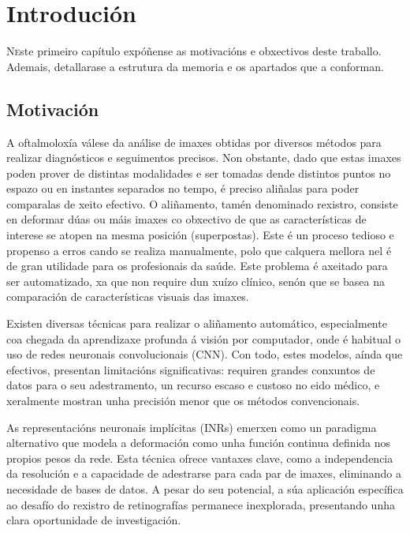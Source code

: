 \chapter{Introdución}
\label{chap:introducion}

\lettrine{N} este primeiro capítulo expóñense as motivacións e obxectivos deste traballo. Ademais, detallarase a estrutura da memoria e os apartados que a conforman.

\section{Motivación}
\label{sec:motivacion}

A oftalmoloxía válese da análise de imaxes obtidas por diversos métodos para realizar diagnósticos e seguimentos precisos. Non obstante, dado que estas imaxes poden prover de distintas modalidades e ser tomadas dende distintos puntos no espazo ou en instantes separados no tempo, é preciso aliñalas para poder comparalas de xeito efectivo. O aliñamento, tamén denominado rexistro, consiste en deformar dúas ou máis imaxes co obxectivo de que as características de interese se atopen na mesma posición (superpostas). Este é un proceso tedioso e propenso a erros cando se realiza manualmente, polo que calquera mellora nel é de gran utilidade para os profesionais da saúde. Este problema é axeitado para ser automatizado, xa que non require dun xuízo clínico, senón que se basea na comparación de características visuais das imaxes.

Existen diversas técnicas para realizar o aliñamento automático, especialmente coa chegada da aprendizaxe profunda á visión por computador, onde é habitual o uso de redes neuronais convolucionais (CNN). Con todo, estes modelos, aínda que efectivos, presentan limitacións significativas: requiren grandes conxuntos de datos para o seu adestramento, un recurso escaso e custoso no eido médico, e xeralmente mostran unha precisión menor que os métodos convencionais.

As representacións neuronais implícitas (INRs) emerxen como un paradigma alternativo que modela a deformación como unha función continua definida nos propios pesos da rede. Esta técnica ofrece vantaxes clave, como a independencia da resolución e a capacidade de adestrarse para cada par de imaxes, eliminando a necesidade de bases de datos. A pesar do seu potencial, a súa aplicación específica ao desafío do rexistro de retinografías permanece inexplorada, presentando unha clara oportunidade de investigación.

